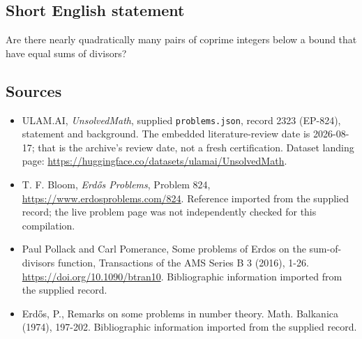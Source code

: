 \documentclass[11pt,a4paper]{article}
\begin{document}
\subsection{Short English statement}

Are there nearly quadratically many pairs of coprime integers below a bound that have equal sums of divisors?

\subsection{Sources}

{\small

\begin{itemize}

\item[\hypertarget{source:2323:1}{S1}] ULAM.AI, \emph{UnsolvedMath}, supplied \texttt{problems.json}, record 2323 (EP-824), statement and background. The embedded literature-review date is 2026-08-17; that is the archive’s review date, not a fresh certification. Dataset landing page: \url{https://huggingface.co/datasets/ulamai/UnsolvedMath}.

\item[\hypertarget{source:2323:2}{S2}] T. F. Bloom, \emph{Erdős Problems}, Problem 824, \url{https://www.erdosproblems.com/824}. Reference imported from the supplied record; the live problem page was not independently checked for this compilation.

\item[\hypertarget{source:2323:3}{S3}] Paul Pollack and Carl Pomerance, Some problems of Erdos on the sum-of-divisors function, Transactions of the AMS Series B 3 (2016), 1-26. \url{https://doi.org/10.1090/btran10}. Bibliographic information imported from the supplied record.

\item[\hypertarget{source:2323:4}{S4}] Erd\H{o}s, P., Remarks on some problems in number theory. Math. Balkanica (1974), 197-202. Bibliographic information imported from the supplied record.

\end{itemize}

}

\label{end:2323}
\end{document}
